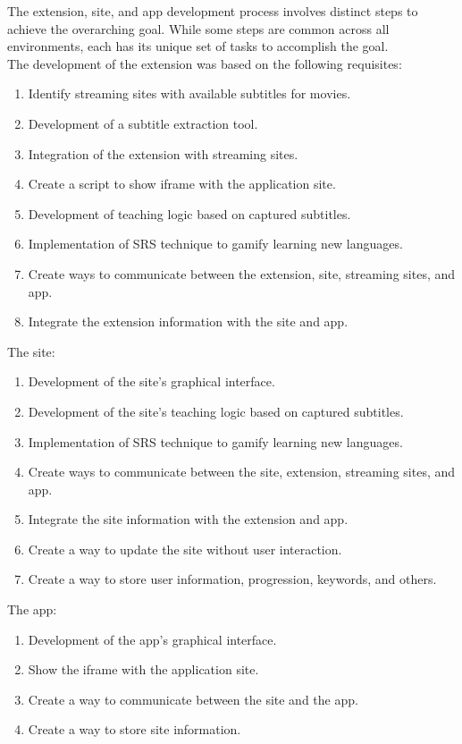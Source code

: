\documentclass[12pt]{article}
\begin{document}
The extension, site, and app development process involves distinct steps to achieve the overarching goal. While some steps are common across all environments, each has its unique set of tasks to accomplish the goal. \\
The development of the extension was based on the following requisites:  
\begin{enumerate}
\item Identify streaming sites with available subtitles for movies.
\item Development of a subtitle extraction tool.
\item Integration of the extension with streaming sites.
\item Create a script to show iframe with the application site.
\item Development of teaching logic based on captured subtitles.
\item Implementation of SRS technique to gamify learning new languages.
\item Create ways to communicate between the extension, site, streaming sites, and app.
\item Integrate the extension information with the site and app.
\end{enumerate}
The site: 

\begin{enumerate}
\item Development of the site's graphical interface.
\item Development of the site's teaching logic based on captured subtitles.
\item Implementation of SRS technique to gamify learning new languages.
\item Create ways to communicate between the site, extension, streaming sites, and app.
\item Integrate the site information with the extension and app.
\item Create a way to update the site without user interaction.
\item Create a way to store user information, progression, keywords, and others.
\end{enumerate}
The app:

\begin{enumerate}
\item Development of the app's graphical interface.
\item Show the iframe with the application site.
\item Create a way to communicate between the site and the app.
\item Create a way to store site information.
\end{enumerate}
\end{document}

